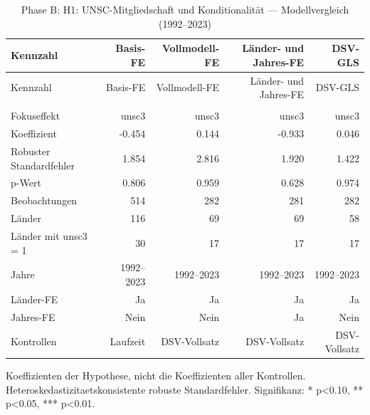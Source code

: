 \begingroup
\scriptsize
\setlength{\tabcolsep}{3pt}
\begin{landscape}
\begin{longtable}{>{\raggedright\arraybackslash}p{4.8cm} r r r r}
\caption{Phase B: H1: UNSC-Mitgliedschaft und Konditionalität — Modellvergleich (1992–2023)}\label{tab:phase_b_h1_modellvergleich}\\
\toprule
Kennzahl & Basis-FE & Vollmodell-FE & Länder- und Jahres-FE & DSV-GLS
 \\
\midrule
\endfirsthead
\toprule
Kennzahl & Basis-FE & Vollmodell-FE & Länder- und Jahres-FE & DSV-GLS
 \\
\midrule
\endhead
\midrule
\multicolumn{5}{r}{Fortsetzung auf der naechsten Seite}\\
\endfoot
\bottomrule
\endlastfoot
Fokuseffekt & unsc3 & unsc3 & unsc3 & unsc3 \\
Koeffizient & -0.454 & 0.144 & -0.933 & 0.046 \\
Robuster Standardfehler & 1.854 & 2.816 & 1.920 & 1.422 \\
p-Wert & 0.806 & 0.959 & 0.628 & 0.974 \\
Beobachtungen & 514 & 282 & 281 & 282 \\
Länder & 116 & 69 & 69 & 58 \\
Länder mit unsc3 = 1 & 30 & 17 & 17 & 17 \\
Jahre & 1992--2023 & 1992--2023 & 1992--2023 & 1992--2023 \\
Länder-FE & Ja & Ja & Ja & Ja \\
Jahres-FE & Nein & Nein & Ja & Nein \\
Kontrollen & Laufzeit & DSV-Vollsatz & DSV-Vollsatz & DSV-Vollsatz \\
\end{longtable}
\noindent\footnotesize Koeffizienten der Hypothese, nicht die Koeffizienten aller Kontrollen. Heteroskedastizitaetskonsistente robuste Standardfehler. Signifikanz: * p<0.10, ** p<0.05, *** p<0.01.\par
\end{landscape}
\endgroup

